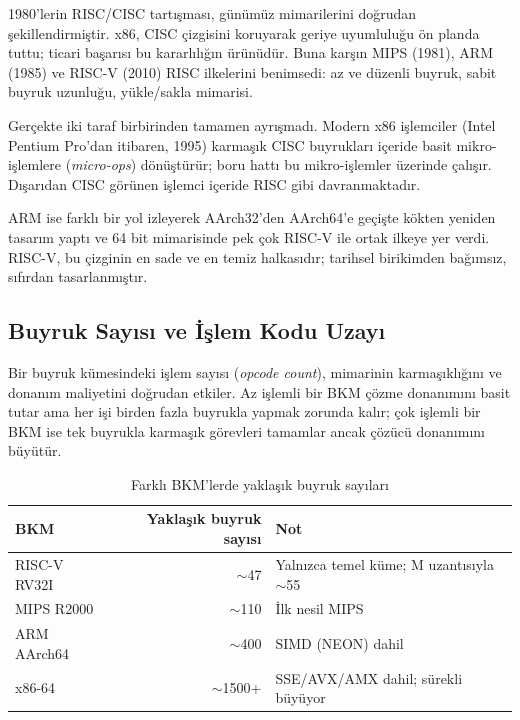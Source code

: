 \begin{karsilastirma}
1980'lerin RISC/CISC tartışması, günümüz mimarilerini doğrudan şekillendirmiştir. x86, CISC çizgisini koruyarak geriye uyumluluğu ön planda tuttu; ticari başarısı bu kararlılığın ürünüdür. Buna karşın MIPS (1981), ARM (1985) ve RISC-V (2010) RISC ilkelerini benimsedi: az ve düzenli buyruk, sabit buyruk uzunluğu, yükle/sakla mimarisi.

Gerçekte iki taraf birbirinden tamamen ayrışmadı. Modern x86 işlemciler (Intel Pentium Pro'dan itibaren, 1995) karmaşık CISC buyrukları içeride basit mikro-işlemlere (\emph{micro-ops}) dönüştürür; boru hattı bu mikro-işlemler üzerinde çalışır. Dışarıdan CISC görünen işlemci içeride RISC gibi davranmaktadır.

ARM ise farklı bir yol izleyerek AArch32'den AArch64'e geçişte kökten yeniden tasarım yaptı ve 64 bit mimarisinde pek çok RISC-V ile ortak ilkeye yer verdi. RISC-V, bu çizginin en sade ve en temiz halkasıdır; tarihsel birikimden bağımsız, sıfırdan tasarlanmıştır.
\end{karsilastirma}

\subsection{Buyruk Sayısı ve İşlem Kodu Uzayı}
\label{sec:buyruk-sayisi}

Bir buyruk kümesindeki işlem sayısı (\emph{opcode count}), mimarinin karmaşıklığını ve donanım maliyetini doğrudan etkiler. Az işlemli bir BKM çözme donanımını basit tutar ama her işi birden fazla buyrukla yapmak zorunda kalır; çok işlemli bir BKM ise tek buyrukla karmaşık görevleri tamamlar ancak çözücü donanımını büyütür.

\begin{table}[H]
\centering
\caption{Farklı BKM'lerde yaklaşık buyruk sayıları}
\label{tab:buyruk-sayilari}
\footnotesize
\begin{tabular}{lrl}
\toprule
\textbf{BKM} & \textbf{Yaklaşık buyruk sayısı} & \textbf{Not} \\
\midrule
RISC-V RV32I  & $\sim$47   & Yalnızca temel küme; M uzantısıyla $\sim$55 \\
MIPS R2000    & $\sim$110  & İlk nesil MIPS \\
ARM AArch64   & $\sim$400  & SIMD (NEON) dahil \\
x86-64        & $\sim$1500+  & SSE/AVX/AMX dahil; sürekli büyüyor \\
\bottomrule
\end{tabular}
\end{table}

